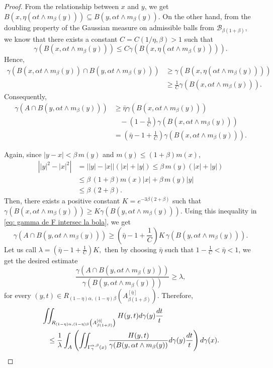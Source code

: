 \documentclass[10pt,a4paper]{amsart}
\begin{document}
\begin{proof}
From the relationship between $x$ and $y$, we get $B(x,\eta (\alpha t\wedge m_\beta(y)))\subseteq B(y,\alpha t\wedge m_\beta(y))$. On the other hand, from the doubling property of the Gaussian measure on admissible balls from $\mathscr{B}_{\beta (1+\beta)}$, we know that there exists a constant $C=C(1/\eta, \beta)>1$ such that
\[\gamma(B(x,\alpha t\wedge m_\beta(y)))\leq C \gamma(B(x,\eta (\alpha  t\wedge m_\beta(y)))).\]
Hence,
\begin{align*}
\gamma(B(x,\alpha t\wedge m_\beta(y))\cap B(y,\alpha t\wedge m_\beta(y)))&\geq \gamma(B(x,\eta (\alpha t\wedge m_\beta(y))))\\ &\geq \frac{1}{C}\gamma(B(x, \alpha t\wedge m_\beta(y))).\end{align*}
Consequently, 
\begin{align}\label{eq: gamma de F intersec la bola}
  \nonumber \gamma(A\cap B(y,\alpha t\wedge m_\beta(y)))&\geq \bar{\eta} \gamma(B(x,\alpha t\wedge m_\beta(y))) \nonumber \\ &\ \ \ \ -\left(1-\frac{1}{C}\right)\gamma(B(x,\alpha t\wedge m_\beta(y)))\nonumber\\
  &=\left(\bar{\eta}-1+\frac{1}{C}\right)\gamma(B(x,\alpha t\wedge m_\beta(y))).
\end{align}

Again, since $|y-x|<\beta\, m(y)$ and $ m(y)\leq (1+\beta) m(x)$,
\begin{align*}
    \left||y|^2-|x|^2\right|&=\left||y|-|x|\right|\left(|x|+|y|\right)\leq \beta\, m(y)(|x|+|y|) \\
    & \leq \beta \, (1+\beta) m(x)|x|+ \beta \, m(y)|y|\\
    &\leq \beta\, (2+\beta).
\end{align*}
Then, there exists a positive constant $K=e^{-3\beta(2+\beta)}$ such that $\gamma(B(x,\alpha t\wedge m_\beta(y)))\geq K \gamma(B(y,\alpha t\wedge m_\beta(y)))$. Using this inequality in \eqref{eq: gamma de F intersec la bola}, we get 
\[\gamma(A\cap B(y,\alpha t\wedge m_\beta(y)))\geq \left(\bar{\eta}-1+\frac{1}{C}\right)K\, \gamma(B(y,\alpha t\wedge m_\beta(y))). \] Let us call $\lambda=\left(\bar{\eta}-1+\frac{1}{C}\right)K,$ then 
by choosing $\bar{\eta}$ such that $1-\frac{1}{C}<\bar{\eta} <1$, we get the desired estimate
\[\frac{\gamma(A\cap B(y,\alpha t\wedge m_\beta(y)))}{\gamma(B(y,\alpha t\wedge m_\beta(y)))}\geq \lambda,\]
for every $(y,t)\in R_{(1-\eta)\alpha, (1-\eta)\beta}\left(A^{[\bar{\eta}]}_{\beta(1+\beta)}\right)$. Therefore, 
\begin{align*} &\iint_{R_{(1-\eta)\alpha, (1-\eta)\beta}\left(A^{[\bar{\eta}]}_{\beta(1+\beta)}\right)} H(y,t) d\gamma(y) \frac{dt}{t}    \\
& \;\;\; \leq \frac{1}{\lambda} \int_A \left(\iint_{\Gamma_\gamma^{\alpha, \beta}(x)} \frac{H(y,t)}{\gamma(B(y,\alpha t\wedge m_\beta(y))} d\gamma(y) \frac{dt}{t}\right) d\gamma(x).\qedhere
\end{align*}
\end{proof}
\end{document}

